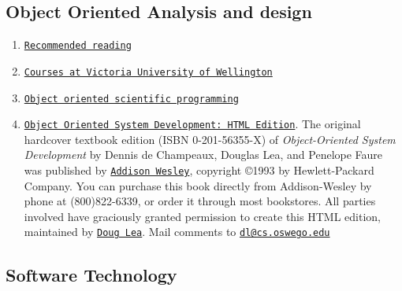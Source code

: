\hypertarget{developments_objectOriented}{}\subsection{Object Oriented Analysis and design}\label{developments_objectOriented}
\begin{enumerate}
\item \href{http://www.devel.lyx.org/references.php3}{\tt Recommended reading}\item \href{http://www.mcs.vuw.ac.nz/courses/COMP201/2003T1/}{\tt Courses at Victoria University of Wellington}\item \href{http://www.tdb.uu.se/%7Engssc/OOP01/module2/}{\tt Object oriented scientific programming}\item \href{http://gee.cs.oswego.edu/dl/oosd/}{\tt Object Oriented System Development: HTML Edition}. The original hardcover textbook edition (ISBN 0-201-56355-X) of {\em Object-Oriented System Development\/} by Dennis de Champeaux, Douglas Lea, and Penelope Faure was published by \href{http://www.awl.com/}{\tt Addison Wesley}, copyright \copyright 1993 by Hewlett-Packard Company. You can purchase this book directly from Addison-Wesley by phone at (800)822-6339, or order it through most bookstores. All parties involved have graciously granted permission to create this HTML edition, maintained by \href{http://gee.cs.oswego.edu/dl/}{\tt Doug Lea}. Mail comments to \href{mailto:%5Bdl@cs.oswego.edu%5D}{\tt dl@cs.oswego.edu}\end{enumerate}
\hypertarget{developments_softwareTechnology}{}\subsection{Software Technology}\label{developments_softwareTechnology}
